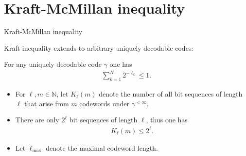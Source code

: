 %





\section{Kraft-McMillan inequality}
\begin{frame}{Kraft-McMillan inequality}

Kraft inequality extends to arbitrary uniquely decodable codes:
\begin{theorem}
For any uniquely decodable code $\gamma$  one has
\begin{align}\label{KraftMcMillan}
\sum_{k=1}^N 2^{-\ell_k}\leq 1. 
\end{align}
\end{theorem}
\begin{itemize}
\item For $\ell, m\in\mathbb{N}$, let $K_{\ell}(m)$ denote the number of all bit sequences of length $\ell$ that arise from $m$ codewords under $\gamma^{<\infty}$. 
\item There are only $2^\ell$  bit sequences of length $\ell$, thus one has
\begin{align}\label{upperK}
K_\ell(m)\leq 2^\ell. 
\end{align}
\item Let $\ell_{\max}$ denote the maximal codeword length. 
\end{itemize}
\end{frame}


